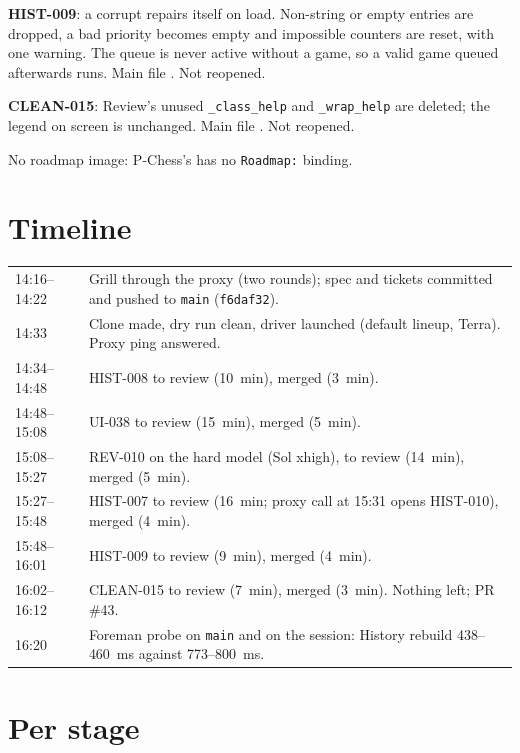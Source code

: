 \documentclass[11pt,a4paper]{article}
\begin{document}
\textbf{HIST-009}: a corrupt  repairs itself on load. Non-string or empty
entries are dropped, a bad priority becomes empty and impossible counters are reset, with one
warning. The queue is never active without a game, so a valid game queued afterwards runs. Main
file . Not reopened.

\textbf{CLEAN-015}: Review's unused \texttt{\_class\_help} and \texttt{\_wrap\_help} are deleted;
the legend on screen is unchanged. Main file . Not reopened.

No roadmap image: P-Chess's  has no \texttt{Roadmap:} binding.

\section*{Timeline}

{\small
\begin{tabularx}{\linewidth}{@{}lX@{}}
\toprule
14:16--14:22 & Grill through the proxy (two rounds); spec and tickets committed and pushed to
        \texttt{main} (\texttt{f6daf32}). \\
14:33 & Clone made, dry run clean, driver launched (default lineup, Terra). Proxy ping answered. \\
14:34--14:48 & HIST-008 to review (10~min), merged (3~min). \\
14:48--15:08 & UI-038 to review (15~min), merged (5~min). \\
15:08--15:27 & REV-010 on the hard model (Sol xhigh), to review (14~min), merged (5~min). \\
15:27--15:48 & HIST-007 to review (16~min; proxy call at 15:31 opens HIST-010), merged (4~min). \\
15:48--16:01 & HIST-009 to review (9~min), merged (4~min). \\
16:02--16:12 & CLEAN-015 to review (7~min), merged (3~min). Nothing left; PR \#43. \\
16:20 & Foreman probe on \texttt{main} and on the session: History rebuild 438--460~ms against
        773--800~ms. \\
\bottomrule
\end{tabularx}
}

\section*{Per stage}
\end{document}
